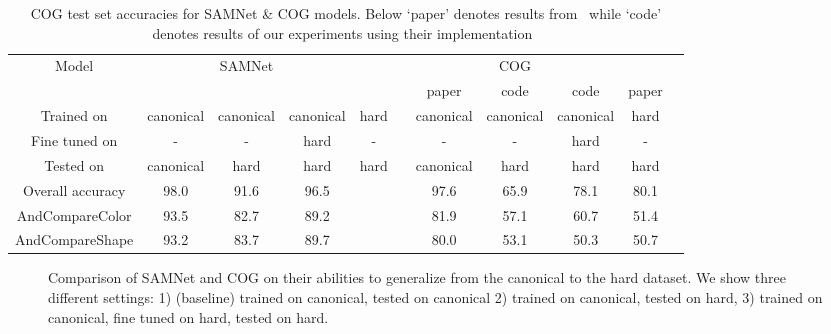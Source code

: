 \begin{table}[t]
\caption{COG test set accuracies for SAMNet \& COG models. Below `paper' denotes results from~\cite{yang2018dataset} 
	while `code' denotes results of our experiments using their implementation~\cite{yang2018implement}}
\centering
\begin{adjustbox}{width=\textwidth}
\begin{tabular}{ccccccccccc}
	\toprule
	Model & & SAMNet & && && COG&& \\
	\cmidrule{2-5} \cmidrule{7-11} 
	&&&&& & paper & code & code & paper&\\
	\cmidrule{7-9} \cmidrule{10-11}
	Trained on       & canonical & canonical & canonical & hard &           &  canonical  & canonical  & canonical & hard \\ 
	Fine tuned on  & - & - & hard  & - &           & -   & - & hard & - \\ 
	Tested on        & canonical & hard & hard & hard &            &canonical  & hard & hard & hard  \\ 
	\midrule	
	Overall accuracy & 98.0 & 91.6 & 96.5  &  &           & 97.6  & 65.9 & 78.1& 80.1 \\ 	
	\midrule 	
	AndCompareColor	&	93.5		&	82.7	&	89.2	& &		&81.9	&57.1&60.7  &	51.4 \\ 
	AndCompareShape	&	93.2 		&	83.7	&	89.7	&&	&	80.0	&53.1	&50.3 &50.7 \\ 
	\bottomrule
\end{tabular}
\end{adjustbox}
\label{tab:results}
\end{table}


\begin{figure}
	\centering
	\caption{Comparison of SAMNet and COG on their abilities to generalize from the canonical to the hard dataset. We show three different settings: 1) (baseline) trained on canonical, tested on canonical 2) trained on canonical, tested on hard, 3) trained on canonical, fine tuned on hard, tested on hard. }
\end{figure}



